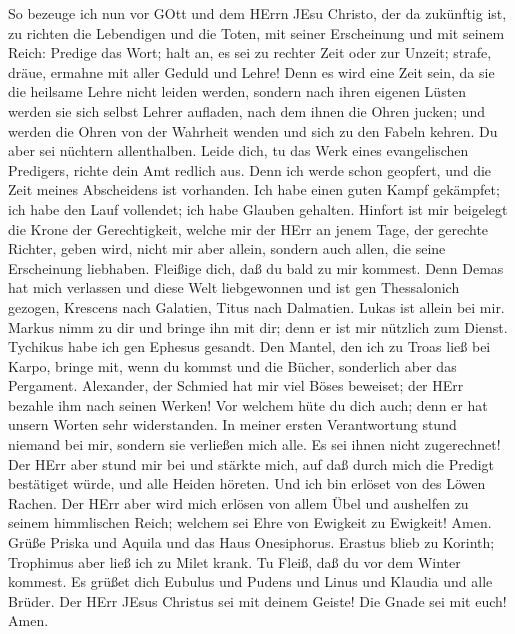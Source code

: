  So bezeuge ich nun vor GOtt und dem HErrn JEsu Christo, der
da zukünftig ist, zu richten die Lebendigen und die Toten, mit seiner
Erscheinung und mit seinem Reich:  Predige das Wort; halt
an, es sei zu rechter Zeit oder zur Unzeit; strafe, dräue, ermahne mit
aller Geduld und Lehre!  Denn es wird eine Zeit sein, da sie
die heilsame Lehre nicht leiden werden, sondern nach ihren eigenen
Lüsten werden sie sich selbst Lehrer aufladen, nach dem ihnen die Ohren
jucken;  und werden die Ohren von der Wahrheit wenden und
sich zu den Fabeln kehren.  Du aber sei nüchtern
allenthalben. Leide dich, tu das Werk eines evangelischen Predigers,
richte dein Amt redlich aus.  Denn ich werde schon geopfert,
und die Zeit meines Abscheidens ist vorhanden.  Ich habe
einen guten Kampf gekämpfet; ich habe den Lauf vollendet; ich habe
Glauben gehalten.  Hinfort ist mir beigelegt die Krone der
Gerechtigkeit, welche mir der HErr an jenem Tage, der gerechte Richter,
geben wird, nicht mir aber allein, sondern auch allen, die seine
Erscheinung liebhaben.  Fleißige dich, daß du bald zu mir
kommest.  Denn Demas hat mich verlassen und diese Welt
liebgewonnen und ist gen Thessalonich gezogen, Krescens nach Galatien,
Titus nach Dalmatien.  Lukas ist allein bei mir. Markus
nimm zu dir und bringe ihn mit dir; denn er ist mir nützlich zum Dienst.
 Tychikus habe ich gen Ephesus gesandt.  Den
Mantel, den ich zu Troas ließ bei Karpo, bringe mit, wenn du kommst und
die Bücher, sonderlich aber das Pergament.  Alexander, der
Schmied hat mir viel Böses beweiset; der HErr bezahle ihm nach seinen
Werken!  Vor welchem hüte du dich auch; denn er hat unsern
Worten sehr widerstanden.  In meiner ersten Verantwortung
stund niemand bei mir, sondern sie verließen mich alle. Es sei ihnen
nicht zugerechnet!  Der HErr aber stund mir bei und stärkte
mich, auf daß durch mich die Predigt bestätiget würde, und alle Heiden
höreten. Und ich bin erlöset von des Löwen Rachen.  Der
HErr aber wird mich erlösen von allem Übel und aushelfen zu seinem
himmlischen Reich; welchem sei Ehre von Ewigkeit zu Ewigkeit! Amen.
 Grüße Priska und Aquila und das Haus Onesiphorus.
 Erastus blieb zu Korinth; Trophimus aber ließ ich zu Milet
krank.  Tu Fleiß, daß du vor dem Winter kommest. Es grüßet
dich Eubulus und Pudens und Linus und Klaudia und alle Brüder.
 Der HErr JEsus Christus sei mit deinem Geiste! Die Gnade
sei mit euch! Amen.
